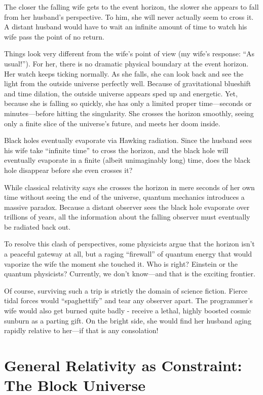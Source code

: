 The closer the falling wife gets to the event horizon, the slower she appears to fall from her husband's perspective.
To him, she will never actually seem to cross it.
A distant husband would have to wait an infinite amount of time to watch his wife pass the point of no return.

Things look very different from the wife's point of view (my wife's response: ``As usual!'').
For her, there is no dramatic physical boundary at the event horizon.
Her watch keeps ticking normally.
As she falls, she can look back and see the light from the outside universe perfectly well.
Because of gravitational blueshift and time dilation, the outside universe appears sped up and energetic.
Yet, because she is falling so quickly, she has only a limited proper time---seconds or minutes---before hitting the singularity.
She crosses the horizon smoothly, seeing only a finite slice of the universe's future, and meets her doom inside.

Black holes eventually evaporate via Hawking radiation.
Since the husband sees his wife take ``infinite time'' to cross the horizon, and the black hole will eventually evaporate in a finite (albeit unimaginably long) time, does the black hole disappear before she even crosses it? 

While classical relativity says she crosses the horizon in mere seconds of her own time without seeing the end of the universe, quantum mechanics introduces a massive paradox.
Because a distant observer sees the black hole evaporate over trillions of years, all the information about the falling observer must eventually be radiated back out. 

To resolve this clash of perspectives, some physicists argue that the horizon isn't a peaceful gateway at all, but a raging ``firewall'' of quantum energy that would vaporize the wife the moment she touched it.
Who is right? Einstein or the quantum physicists? Currently, we don't know---and that is the exciting frontier.


Of course, surviving such a trip is strictly the domain of science fiction.
Fierce tidal forces would ``spaghettify'' and tear any observer apart.
The programmer's wife would also get burned quite badly - receive a lethal, highly boosted cosmic sunburn as a parting gift.
On the bright side, she would find her husband aging rapidly relative to her---if that is any consolation!

\section{General Relativity as Constraint: The Block Universe}

